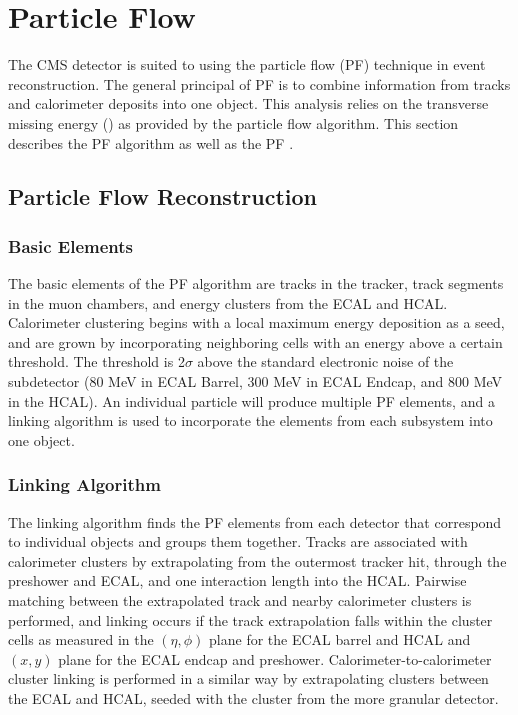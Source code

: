 \section{Particle Flow}
The CMS detector is suited to using the particle flow (PF) technique in event reconstruction. The general principal of PF is to combine information from tracks and calorimeter deposits into one object. This analysis relies on the transverse missing energy (\met) as provided by the particle flow algorithm. This section describes the PF algorithm as well as the PF \met. 

\subsection{Particle Flow Reconstruction}
\subsubsection{Basic Elements}
The basic elements of the PF algorithm are tracks in the tracker, track segments in the muon chambers, and energy clusters from the ECAL and HCAL. 
Calorimeter clustering begins with a local maximum energy deposition as a seed, and are grown by incorporating neighboring cells with an energy above a certain threshold. The threshold is 2$\sigma$ above the standard electronic noise of the subdetector (80 MeV in ECAL Barrel, 300 MeV in ECAL Endcap, and 800 MeV in the HCAL). 
An individual particle will produce multiple PF elements, and a linking algorithm is used to incorporate the elements from each subsystem into one object. 

\subsubsection{Linking Algorithm}
The linking algorithm finds the PF elements from each detector that correspond to individual objects and groups them together. Tracks are associated with calorimeter clusters by extrapolating from the outermost tracker hit, through the preshower and ECAL, and one interaction length into the HCAL. Pairwise matching between the extrapolated track and nearby calorimeter clusters is performed, and linking occurs if the track extrapolation falls within the cluster cells as measured in the $(\eta,\phi)$ plane for the ECAL barrel and HCAL and $(x,y)$ plane for the ECAL endcap and preshower. Calorimeter-to-calorimeter cluster linking is performed in a similar way by extrapolating clusters between the ECAL and HCAL, seeded with the cluster from the more granular detector. 

